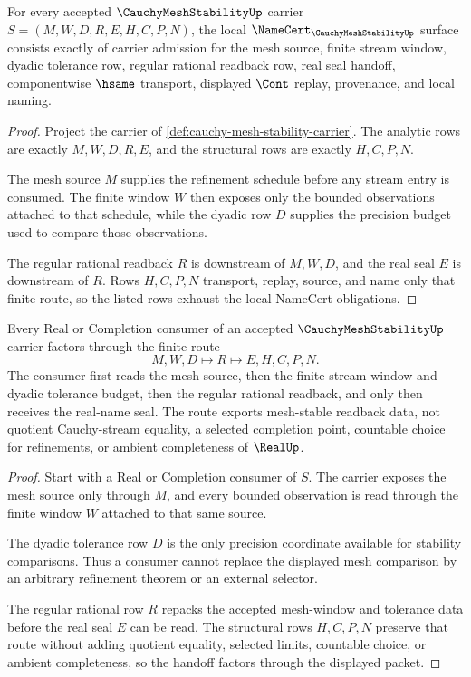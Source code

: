 \begin{theorem}
\label{thm:cauchy-mesh-stability-namecert-obligations}
For every accepted $\CauchyMeshStabilityUp$ carrier $S=(M,W,D,R,E,H,C,P,N)$, the local $\NameCert_{\CauchyMeshStabilityUp}$ surface consists exactly of carrier admission for the mesh source, finite stream window, dyadic tolerance row, regular rational readback row, real seal handoff, componentwise $\hsame$ transport, displayed $\Cont$ replay, provenance, and local naming.
\end{theorem}
\begin{proof}
Project the carrier of \autoref{def:cauchy-mesh-stability-carrier}. The analytic rows are exactly $M,W,D,R,E$, and the structural rows are exactly $H,C,P,N$.

The mesh source $M$ supplies the refinement schedule before any stream entry is consumed. The finite window $W$ then exposes only the bounded observations attached to that schedule, while the dyadic row $D$ supplies the precision budget used to compare those observations.

The regular rational readback $R$ is downstream of $M,W,D$, and the real seal $E$ is downstream of $R$. Rows $H,C,P,N$ transport, replay, source, and name only that finite route, so the listed rows exhaust the local NameCert obligations.
\end{proof}

\begin{theorem}
\label{thm:cauchy-mesh-stability-real-completion-handoff}
Every Real or Completion consumer of an accepted $\CauchyMeshStabilityUp$ carrier factors through the finite route
$$
M,W,D \longmapsto R \longmapsto E,H,C,P,N .
$$
The consumer first reads the mesh source, then the finite stream window and dyadic tolerance budget, then the regular rational readback, and only then receives the real-name seal. The route exports mesh-stable readback data, not quotient Cauchy-stream equality, a selected completion point, countable choice for refinements, or ambient completeness of $\RealUp$.
\end{theorem}
\begin{proof}
Start with a Real or Completion consumer of $S$. The carrier exposes the mesh source only through $M$, and every bounded observation is read through the finite window $W$ attached to that same source.

The dyadic tolerance row $D$ is the only precision coordinate available for stability comparisons. Thus a consumer cannot replace the displayed mesh comparison by an arbitrary refinement theorem or an external selector.

The regular rational row $R$ repacks the accepted mesh-window and tolerance data before the real seal $E$ can be read. The structural rows $H,C,P,N$ preserve that route without adding quotient equality, selected limits, countable choice, or ambient completeness, so the handoff factors through the displayed packet.
\end{proof}

